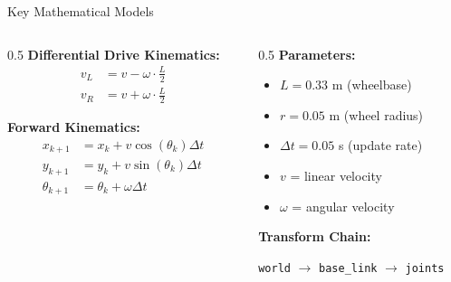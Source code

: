 \documentclass[aspectratio=169]{beamer}
\begin{document}
\begin{frame}{Key Mathematical Models}
\begin{columns}
\begin{column}{0.5\textwidth}
\textbf{Differential Drive Kinematics:}
\begin{align}
v_L &= v - \omega \cdot \frac{L}{2}\\
v_R &= v + \omega \cdot \frac{L}{2}
\end{align}

\textbf{Forward Kinematics:}
\begin{align}
x_{k+1} &= x_k + v \cos(\theta_k) \Delta t\\
y_{k+1} &= y_k + v \sin(\theta_k) \Delta t\\
\theta_{k+1} &= \theta_k + \omega \Delta t
\end{align}
\end{column}

\begin{column}{0.5\textwidth}
\textbf{Parameters:}
\begin{itemize}
    \item $L = 0.33$ m (wheelbase)
    \item $r = 0.05$ m (wheel radius)
    \item $\Delta t = 0.05$ s (update rate)
    \item $v$ = linear velocity
    \item $\omega$ = angular velocity
\end{itemize}

\textbf{Transform Chain:}
\begin{center}
\texttt{world} $\rightarrow$ \texttt{base\_link} $\rightarrow$ \texttt{joints}
\end{center}
\end{column}
\end{columns}
\end{frame}
\end{document}
